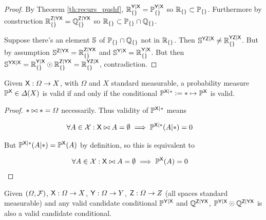 
\begin{proof}
By Theorem \ref{th:recurs_pushf}, $\mathbb{R}_{\{\}}^{\mathsf{Y}|\mathsf{X}}=\mathbb{P}_{\{\}}^{\mathsf{Y}|\mathsf{X}}$ so $\mathbb{R}_{\{\}}\subset\mathbb{P}_{\{\}}$. Furthermore by construction $\mathbb{R}_{\{\}}^{\mathsf{Z}|\mathsf{YX}}=\mathbb{Q}_{\{\}}^{\mathsf{Z}|\mathsf{YX}}$ so $\mathbb{R}_{\{\}}\subset \mathbb{P}_{\{\}}\cap\mathbb{Q}_{\{\}}$.

Suppose there's an element $\mathbb{S}$ of $\mathbb{P}_{\{\}}\cap\mathbb{Q}_{\{\}}$ not in $\mathbb{R}_{\{\}}$. Then $\mathbb{S}^{\mathsf{YZ}|\mathsf{X}}\neq \mathbb{R}_{\{\}}^{\mathsf{YZ}|\mathsf{X}}$. But by assumption $\mathbb{S}^{\mathsf{Z}|\mathsf{YX}} = \mathbb{R}_{\{\}}^{\mathsf{Z}|\mathsf{YX}}$ and $\mathbb{S}^{\mathsf{Y}|\mathsf{X}} = \mathbb{R}_{\{\}}^{\mathsf{Y}|\mathsf{X}}$. But then $\mathbb{S}^{\mathsf{YX}|\mathsf{X}} = \mathbb{R}_{\{\}}^{\mathsf{Y}|\mathsf{X}} \odot \mathbb{R}_{\{\}}^{\mathsf{Z}|\mathsf{YX}} = \mathbb{R}_{\{\}}^{\mathsf{YZ}|\mathsf{X}}$, contradiction.
\end{proof}

\begin{lemma}\label{th:valid_agree}
Given $\mathsf{X}:\Omega\to X$, with $\Omega$ and $X$ standard measurable, a probability measure $\mathbb{P}^{\mathsf{X}}\in \Delta(X)$ is valid if and only if the conditional $\mathbb{P}^{\mathsf{X}|*}:=*\mapsto \mathbb{P}^{\mathsf{X}}$ is valid.
\end{lemma}

\begin{proof}
$*\bowtie *=\Omega$ necessarily. Thus validity of $\mathbb{P}^{\mathsf{X}|*}$ means 

\begin{align}
	\forall A\in \mathcal{X}: \mathsf{X}\bowtie A=\emptyset \implies \mathbb{P}^{\mathsf{X}|*}(A|*)&=0
\end{align}

But $\mathbb{P}^{\mathsf{X}|*}(A|*)=\mathbb{P}^{\mathsf{X}}(A)$ by definition, so this is equivalent to

\begin{align}
	\forall A\in \mathcal{X}: \mathsf{X}\bowtie A=\emptyset \implies \mathbb{P}^{\mathsf{X}}(A)&=0
\end{align}
\end{proof}


\begin{lemma}\label{lem:valid_extendability}
Given $(\Omega,\mathcal{F})$, $\mathsf{X}:\Omega\to X$, $\mathsf{Y}:\Omega\to Y$, $\mathsf{Z}:\Omega\to Z$ (all spaces standard measurable) and any valid candidate conditional $\mathbb{P}^{\mathsf{Y}|\mathsf{X}}$ and $\mathbb{Q}^{\mathsf{Z}|\mathsf{Y}\mathsf{X}}$, $ \mathbb{P}^{\mathsf{Y}|\mathsf{X}}\odot \mathbb{Q}^{\mathsf{Z}|\mathsf{Y}\mathsf{X}}$ is also a valid candidate conditional.
\end{lemma}

